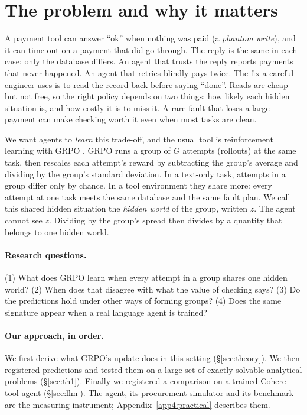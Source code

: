 \documentclass[11pt]{article}
\begin{document}
\section{The problem and why it matters}\label{sec:intro}
A payment tool can answer ``ok'' when nothing was paid (a \emph{phantom write}), and it can time out on a payment that
did go through. The reply is the same in each case; only the database differs. An agent that trusts the reply reports
payments that never happened. An agent that retries blindly pays twice. The fix a careful engineer uses is to read the
record back before saying ``done''. Reads are cheap but not free, so the right policy depends on two things: how likely
each hidden situation is, and how costly it is to miss it. A rare fault that loses a large payment can make checking
worth it even when most tasks are clean.

We want agents to \emph{learn} this trade-off, and the usual tool is reinforcement learning with GRPO
\citep{shao2024deepseekmathpushinglimitsmathematical}. GRPO runs a group of $G$ attempts (rollouts) at the same task,
then rescales each attempt's reward by subtracting the group's average and dividing by the group's standard
deviation. In a text-only task, attempts in a group differ only by chance. In a tool environment they share more: every
attempt at one task meets the same database and the same fault plan. We call this shared hidden situation the
\emph{hidden world} of the group, written $z$. The agent cannot see $z$. Dividing by the group's spread then divides
by a quantity that belongs to one hidden world.

\paragraph{Research questions.} (1) What does GRPO learn when every attempt in a group shares one hidden world?
(2) When does that disagree with what the value of checking says? (3) Do the predictions hold under other ways of
forming groups? (4) Does the same signature appear when a real language agent is trained?

\paragraph{Our approach, in order.} We first derive what GRPO's update does in this setting
(\S\ref{sec:theory}). We then registered predictions and tested them on a large set of exactly solvable analytical
problems (\S\ref{sec:th1}). Finally we registered a comparison on a trained Cohere tool agent (\S\ref{sec:llm}). The
agent, its procurement simulator and its benchmark are the measuring instrument; Appendix~\ref{app4:practical}
describes them.
\end{document}
